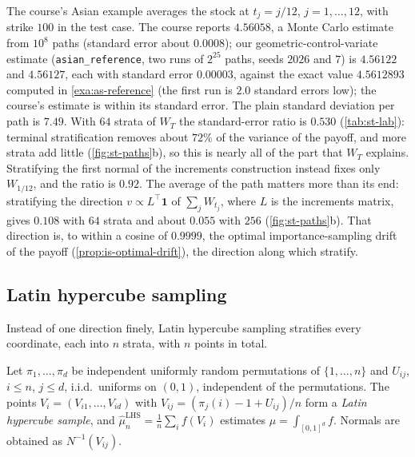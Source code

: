 \begin{example}\label{exa:st-asian}
The course's Asian example averages the stock at $t_j=j/12$, $j=1,\dots,12$, with strike
$100$ in the test case. The course reports $4.56058$, a Monte Carlo estimate from $10^8$
paths (standard error about $0.0008$); our geometric-control-variate estimate
(\texttt{asian\_reference}, two runs of $2^{25}$ paths, seeds $2026$ and $7$) is $4.56122$ and
$4.56127$, each with standard error $0.00003$, against the exact value $4.5612893$ computed in
\cref{exa:as-reference} (the first run is $2.0$ standard errors low); the course's estimate is
within its standard error. The plain standard deviation per path is $7.49$.
With $64$ strata of $W_T$ the standard-error ratio is $0.530$ (\cref{tab:st-lab}): terminal stratification removes about $72\%$ of the
variance of the payoff, and more strata add little (\cref{fig:st-paths}b), so this is nearly
all of the part that $W_T$ explains. Stratifying the first normal of the
increments construction instead fixes only $W_{1/12}$, and the ratio is $0.92$. The average
of the path matters more than its end: stratifying the direction $v\propto L^\top\mathbf 1$ of
$\sum_jW_{t_j}$, where $L$ is the increments matrix, gives $0.108$ with $64$ strata and about
$0.055$ with $256$ (\cref{fig:st-paths}b). That direction is, to within a cosine of $0.9999$,
the optimal importance-sampling drift of the payoff (\cref{prop:is-optimal-drift}), the
direction along which \textcite{glasserman-heidelberger-shahabuddin} stratify.
\end{example}

\subsection{Latin hypercube sampling}\label{sec:st-lhs}

Instead of one direction finely, Latin hypercube sampling stratifies every coordinate,
each into $n$ strata, with $n$ points in total.

\begin{definition}\label{def:st-lhs}
Let $\pi_1,\dots,\pi_d$ be independent uniformly random permutations of $\{1,\dots,n\}$ and
$U_{ij}$, $i\le n$, $j\le d$, i.i.d.\ uniforms on $(0,1)$, independent of the permutations. The
points $V_i=(V_{i1},\dots,V_{id})$ with $V_{ij}=(\pi_j(i)-1+U_{ij})/n$ form a \emph{Latin
hypercube sample}, and $\hat\mu^{\mathrm{LHS}}_n=\frac1n\sum_if(V_i)$ estimates
$\mu=\int_{[0,1]^d}f$. Normals are obtained as $N^{-1}(V_{ij})$.
\end{definition}

